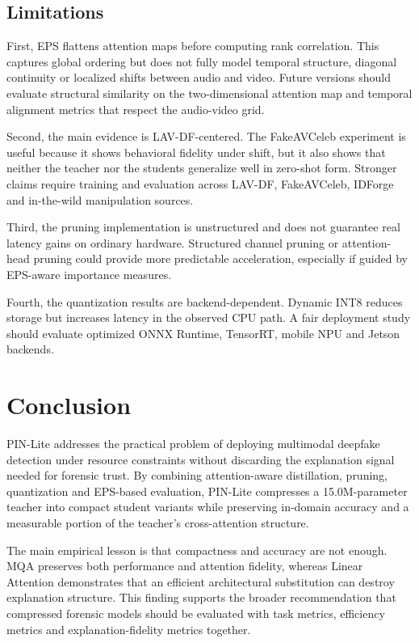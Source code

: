 \documentclass[pdflatex,sn-basic,Numbered]{sn-jnl}
\begin{document}
\subsection{Limitations}\label{subsec:limitations}

First, EPS flattens attention maps before computing rank correlation. This captures global ordering but does not fully model temporal structure, diagonal continuity or localized shifts between audio and video. Future versions should evaluate structural similarity on the two-dimensional attention map and temporal alignment metrics that respect the audio-video grid.

Second, the main evidence is LAV-DF-centered. The FakeAVCeleb experiment is useful because it shows behavioral fidelity under shift, but it also shows that neither the teacher nor the students generalize well in zero-shot form. Stronger claims require training and evaluation across LAV-DF, FakeAVCeleb, IDForge and in-the-wild manipulation sources.

Third, the pruning implementation is unstructured and does not guarantee real latency gains on ordinary hardware. Structured channel pruning or attention-head pruning could provide more predictable acceleration, especially if guided by EPS-aware importance measures.

Fourth, the quantization results are backend-dependent. Dynamic INT8 reduces storage but increases latency in the observed CPU path. A fair deployment study should evaluate optimized ONNX Runtime, TensorRT, mobile NPU and Jetson backends.

\section{Conclusion}\label{sec:conclusion}

PIN-Lite addresses the practical problem of deploying multimodal deepfake detection under resource constraints without discarding the explanation signal needed for forensic trust. By combining attention-aware distillation, pruning, quantization and EPS-based evaluation, PIN-Lite compresses a 15.0M-parameter teacher into compact student variants while preserving in-domain accuracy and a measurable portion of the teacher's cross-attention structure.

The main empirical lesson is that compactness and accuracy are not enough. MQA preserves both performance and attention fidelity, whereas Linear Attention demonstrates that an efficient architectural substitution can destroy explanation structure. This finding supports the broader recommendation that compressed forensic models should be evaluated with task metrics, efficiency metrics and explanation-fidelity metrics together.
\end{document}
